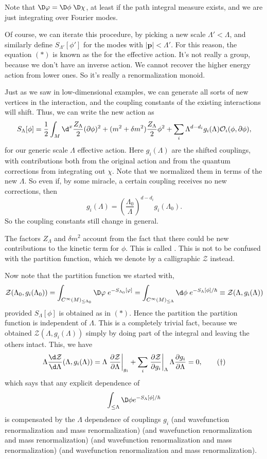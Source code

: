 \documentclass[a4paper]{article}
\begin{document}
Note that $\D \varphi = \D \phi\;\D \chi$, at least if the path integral measure exists, and we are just integrating over Fourier modes.

Of course, we can iterate this procedure, by picking a new scale $\Lambda' < \Lambda$, and similarly define $S_{\Lambda'}[\phi']$ for the modes with $|\mathbf{p}| < \Lambda'$. For this reason, the equation $(*)$ is known as the  for the effective action. It's not really a group, because we don't have an inverse action. We cannot recover the higher energy action from lower ones. So it's really a renormalization monoid.

Just as we saw in low-dimensional examples, we can generate all sorts of new vertices in the interaction, and the coupling constants of the existing interactions will shift. Thus, we can write the new action as
\[
  S_\Lambda[\phi] = \frac{1}{2} \int_M \d^x \frac{Z_\Lambda}{2} (\partial \phi)^2 + (m^2 + \delta m^2) \frac{Z_\Lambda}{2} \phi^2 + \sum_i \Lambda^{d - d_i} g_i(\Lambda) \mathcal{O}_i (\phi, \partial \phi),
\]
for our generic scale $\Lambda$ effective action. Here $g_i(\Lambda)$ are the shifted couplings, with contributions both from the original action and from the quantum corrections from integrating out $\chi$. Note that we normalized them in terms of the new $\Lambda$. So even if, by some miracle, a certain coupling receives no new corrections, then
\[
  g_i(\Lambda) = \left(\frac{\Lambda_0}{\Lambda}\right)^{d - d_i} g_i(\Lambda_0).
\]
So the coupling constants still change in general.

The factors $Z_\Lambda$ and $\delta m^2$ account from the fact that there could be new contributions to the kinetic term for $\phi$. This  is called . This is not to be confused with the partition function, which we denote by a calligraphic $\mathcal{Z}$ instead.

Now note that the partition function we started with,
\[
  \mathcal{Z}(\Lambda_0,  g_i(\Lambda_0)) = \int_{C^\infty(M)_{\leq \Lambda_0}} \D \varphi\;e^{-S_{\Lambda_0}[\varphi]} = \int_{C^\infty(M)_{\leq \Lambda}}\d \phi\;  e^{-S_\Lambda[\phi]/\hbar} \equiv \mathcal{Z}(\Lambda, g_i(\Lambda))
\]
provided $S_\Lambda[\phi]$ is obtained as in $(*)$. Hence the partition the partition function is independent of $\Lambda$. This is a completely trivial fact, because we obtained $\mathcal{Z}(\Lambda, g_i(\Lambda))$ simply by doing part of the integral and leaving the others intact. This, we have
\[
  \Lambda \frac{\d \mathcal{Z}}{\d \Lambda} (\Lambda, g_i(\Lambda)) = \Lambda \left.\frac{\partial \mathcal{Z}}{\partial \Lambda}\right|_{g_i} + \sum_i \left.\frac{\partial \mathcal{Z}}{\partial g_i}\right|_{\Lambda} \Lambda \frac{\partial g_i}{\partial \Lambda} = 0, \tag{$\dagger$}
\]
which says that any explicit dependence of
\[
  \int_{\leq \Lambda} \D \phi e^{-S_\Lambda[\phi]/\hbar}
\]
is compensated by the $\Lambda$ dependence of couplings $g_i$ (and wavefunction renormalization and mass renormalization) (and wavefunction renormalization and mass renormalization) (and wavefunction renormalization and mass renormalization) (and wavefunction renormalization and mass renormalization).
\end{document}
